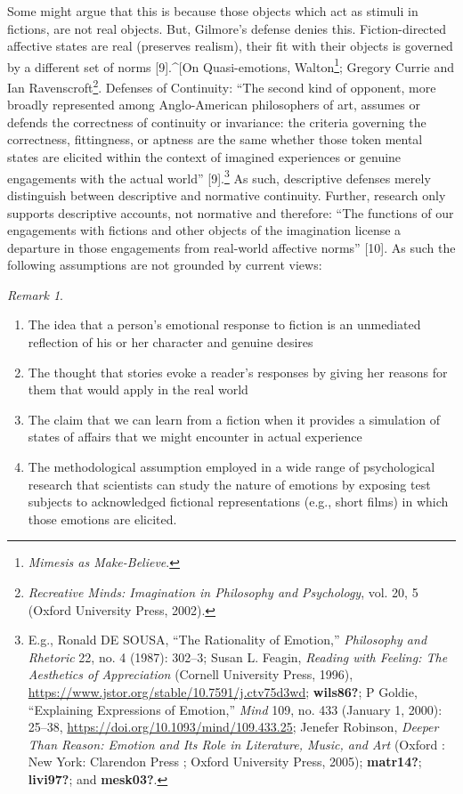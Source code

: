 \documentclass[phdthesis,12pt,final]{wuthesis}
\theoremstyle{definition}
\theoremstyle{definition}
\theoremstyle{definition}
\theoremstyle{definition}
\theoremstyle{remark}
\newtheorem*{remark}{Remark}
\begin{document}
Some might argue that this is because those objects which act as stimuli in fictions, are not real objects. But, Gilmore's defense denies this. Fiction-directed affective states are real (preserves realism), their fit with their objects is governed by a different set of norms {[}9{]}.\^{}{[}On Quasi-emotions, Walton\footnote{\emph{Mimesis as {Make-Believe}}.}; Gregory Currie and Ian Ravenscroft\footnote{\emph{Recreative Minds: Imagination in Philosophy and Psychology}, vol. 20, 5 (Oxford University Press, 2002).}. Defenses of Continuity: ``The second kind of opponent, more broadly represented among Anglo-American philosophers of art, assumes or defends the correctness of continuity or invariance: the criteria governing the correctness, fittingness, or aptness are the same whether those token mental states are elicited within the context of imagined experiences or genuine engagements with the actual world'' {[}9{]}.\footnote{E.g., Ronald DE SOUSA, {``The {Rationality} of {Emotion},''} \emph{Philosophy and Rhetoric} 22, no. 4 (1987): 302--3; Susan L. Feagin, \emph{Reading with {Feeling}: {The Aesthetics} of {Appreciation}} (Cornell University Press, 1996), \url{https://www.jstor.org/stable/10.7591/j.ctv75d3wd}; \textbf{wils86?}; P Goldie, {``Explaining Expressions of Emotion,''} \emph{Mind} 109, no. 433 (January 1, 2000): 25--38, \url{https://doi.org/10.1093/mind/109.433.25}; Jenefer Robinson, \emph{Deeper Than Reason: Emotion and Its Role in Literature, Music, and Art} (Oxford : New York: Clarendon Press ; Oxford University Press, 2005); \textbf{matr14?}; \textbf{livi97?}; and \textbf{mesk03?}.} As such, descriptive defenses merely distinguish between descriptive and normative continuity. Further, research only supports descriptive accounts, not normative and therefore: ``The functions of our engagements with fictions and other objects of the imagination license a departure in those engagements from real-world affective norms'' {[}10{]}. As such the following assumptions are not grounded by current views:

\begin{remark}
\leavevmode

\begin{enumerate}
\def\labelenumi{\arabic{enumi}.}
\tightlist
\item
  The idea that a person's emotional response to fiction is an unmediated reflection of his or her character and genuine desires
\item
  The thought that stories evoke a reader's responses by giving her reasons for them that would apply in the real world
\item
  The claim that we can learn from a fiction when it provides a simulation of states of affairs that we might encounter in actual experience
\item
  The methodological assumption employed in a wide range of psychological research that scientists can study the nature of emotions by exposing test subjects to acknowledged fictional representations (e.g., short films) in which those emotions are elicited.
\end{enumerate}

\end{remark}
\end{document}
